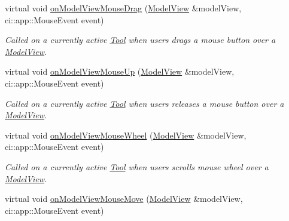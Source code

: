 \begin{DoxyCompactItemize}
\mbox{\label{classpepr3d_1_1_tool_a56cc05810dfb90d78b0c1388f710a445}} 
virtual void \mbox{\hyperlink{classpepr3d_1_1_tool_a56cc05810dfb90d78b0c1388f710a445}{on\+Model\+View\+Mouse\+Drag}} (\mbox{\hyperlink{classpepr3d_1_1_model_view}{Model\+View}} \&model\+View, ci\+::app\+::\+Mouse\+Event event)
\begin{DoxyCompactList}\small\item\em Called on a currently active \mbox{\hyperlink{classpepr3d_1_1_tool}{Tool}} when users drags a mouse button over a \mbox{\hyperlink{classpepr3d_1_1_model_view}{Model\+View}}. \end{DoxyCompactList}\item 
\mbox{\label{classpepr3d_1_1_tool_a3d6d4e593753eba998b2a6d6fb49c5af}} 
virtual void \mbox{\hyperlink{classpepr3d_1_1_tool_a3d6d4e593753eba998b2a6d6fb49c5af}{on\+Model\+View\+Mouse\+Up}} (\mbox{\hyperlink{classpepr3d_1_1_model_view}{Model\+View}} \&model\+View, ci\+::app\+::\+Mouse\+Event event)
\begin{DoxyCompactList}\small\item\em Called on a currently active \mbox{\hyperlink{classpepr3d_1_1_tool}{Tool}} when users releases a mouse button over a \mbox{\hyperlink{classpepr3d_1_1_model_view}{Model\+View}}. \end{DoxyCompactList}\item 
\mbox{\label{classpepr3d_1_1_tool_aa1aae7ecebb6d2e63dfa61d08ff022ae}} 
virtual void \mbox{\hyperlink{classpepr3d_1_1_tool_aa1aae7ecebb6d2e63dfa61d08ff022ae}{on\+Model\+View\+Mouse\+Wheel}} (\mbox{\hyperlink{classpepr3d_1_1_model_view}{Model\+View}} \&model\+View, ci\+::app\+::\+Mouse\+Event event)
\begin{DoxyCompactList}\small\item\em Called on a currently active \mbox{\hyperlink{classpepr3d_1_1_tool}{Tool}} when users scrolls mouse wheel over a \mbox{\hyperlink{classpepr3d_1_1_model_view}{Model\+View}}. \end{DoxyCompactList}\item 
\mbox{\label{classpepr3d_1_1_tool_a25a3db1cbb37241f473e009ac702d867}} 
virtual void \mbox{\hyperlink{classpepr3d_1_1_tool_a25a3db1cbb37241f473e009ac702d867}{on\+Model\+View\+Mouse\+Move}} (\mbox{\hyperlink{classpepr3d_1_1_model_view}{Model\+View}} \&model\+View, ci\+::app\+::\+Mouse\+Event event)

\end{DoxyCompactItemize}
